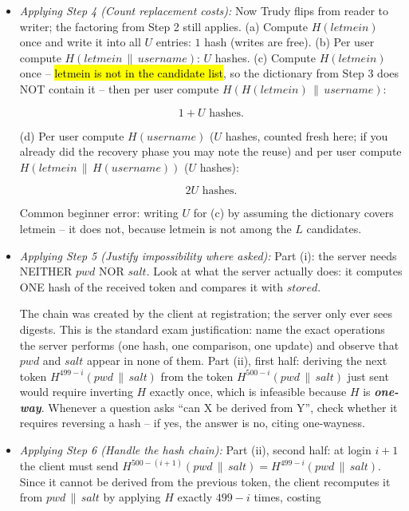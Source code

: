 \documentclass[12pt, a4paper]{article}
\newcommand{\term}[1]{\textbf{\textit{#1}}}        %
\newcommand{\imp}[1]{\hl{#1}}                       %
\begin{document}
\begin{itemize}
\[
U \cdot L \text{ hashes.}
\]

(c) Precompute the dictionary $H(candidate)$ for all $L$ candidates ($L$ hashes, reused for every user), then per user compute the outer hash $H(H(candidate) \,\|\, username)$ for all $L$ candidates ($U \cdot L$ hashes):

\[
L + U \cdot L \text{ hashes.}
\]

(d) Precompute $H(username)$ once per user ($U$ hashes total), then per user compute $H(candidate \,\|\, H(username))$ for all $L$ candidates ($U \cdot L$ hashes):

\[
U + U \cdot L \text{ hashes.}
\]

Sanity check for beginners: the total is always (one-time precomputation) plus $U \cdot L$ times the per-candidate work that remains after reuse.
    \item \textit{Applying Step 4 (Count replacement costs):} Now Trudy flips from reader to writer; the factoring from Step 2 still applies. (a) Compute $H(letmein)$ once and write it into all $U$ entries: $1$ hash (writes are free). (b) Per user compute $H(letmein \,\|\, username)$: $U$ hashes. (c) Compute $H(letmein)$ once -- \imp{letmein is not in the candidate list}, so the dictionary from Step 3 does NOT contain it -- then per user compute $H(H(letmein) \,\|\, username)$:

\[
1 + U \text{ hashes.}
\]

(d) Per user compute $H(username)$ ($U$ hashes, counted fresh here; if you already did the recovery phase you may note the reuse) and per user compute $H(letmein \,\|\, H(username))$ ($U$ hashes):

\[
2U \text{ hashes.}
\]

Common beginner error: writing $U$ for (c) by assuming the dictionary covers letmein -- it does not, because letmein is not among the $L$ candidates.
    \item \textit{Applying Step 5 (Justify impossibility where asked):} Part (i): the server needs NEITHER $pwd$ NOR $salt$. Look at what the server actually does: it computes ONE hash of the received token and compares it with $stored$.

    The chain was created by the client at registration; the server only ever sees digests. This is the standard exam justification: name the exact operations the server performs (one hash, one comparison, one update) and observe that $pwd$ and $salt$ appear in none of them.
    Part (ii), first half: deriving the next token $H^{499-i}(pwd \,\|\, salt)$ from the token $H^{500-i}(pwd \,\|\, salt)$ just sent would require inverting $H$ exactly once, which is infeasible because $H$ is \term{one-way}.
    Whenever a question asks ``can X be derived from Y'', check whether it requires reversing a hash -- if yes, the answer is no, citing one-wayness.
    \item \textit{Applying Step 6 (Handle the hash chain):} Part (ii), second half: at login $i+1$ the client must send $H^{500-(i+1)}(pwd \,\|\, salt) = H^{499-i}(pwd \,\|\, salt)$. Since it cannot be derived from the previous token, the client recomputes it from $pwd \,\|\, salt$ by applying $H$ exactly $499 - i$ times, costing


\end{itemize}
\end{document}
